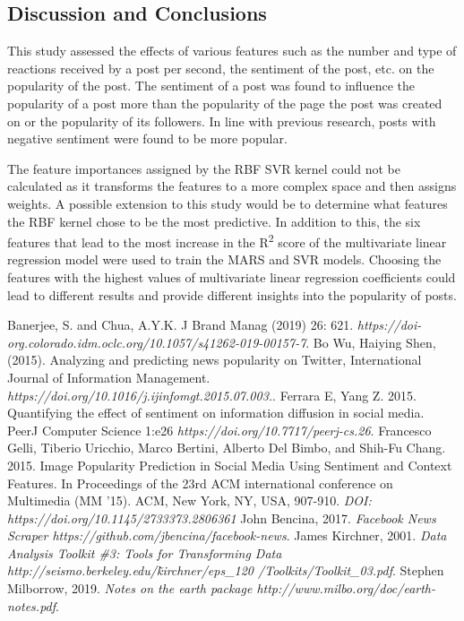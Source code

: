 \documentclass[twoside]{article}
\begin{document}
\begin{multicols}{2}
\section{Discussion and Conclusions}
This study assessed the effects of various features such as the number and type of reactions received by a post per second, the sentiment of the post, etc. on the popularity of the post. The sentiment of a post was found to influence the popularity of a post more than the popularity of the page the post was created on or the popularity of its followers. In line with previous research, posts with negative sentiment were found to be more popular. 

The feature importances assigned by the RBF SVR kernel could not be calculated as it transforms the features to a more complex space and then assigns weights. A possible extension to this study would be to determine what features the RBF kernel chose to be the most predictive. In addition to this, the six features that lead to the most increase in the R\textsuperscript{2} score of the multivariate linear regression model were used to train the MARS and SVR models. Choosing the features with the highest values of multivariate linear regression coefficients could lead to different results and provide different insights into the popularity of posts. 
\begin{thebibliography}{9}
Banerjee, S. and Chua, A.Y.K. J Brand Manag (2019) 26: 621. \textit{https://doi-org.colorado.idm.oclc.org/10.1057/s41262-019-00157-7}.
Bo Wu, Haiying Shen, (2015). Analyzing and predicting news popularity on Twitter,
International Journal of Information Management.
\textit{https://doi.org/10.1016/j.ijinfomgt.2015.07.003.}.
Ferrara E, Yang Z. 2015. Quantifying the effect of sentiment on information diffusion in social media. PeerJ Computer Science 1:e26 
\textit{https://doi.org/10.7717/peerj-cs.26}.
Francesco Gelli, Tiberio Uricchio, Marco Bertini, Alberto Del Bimbo, and Shih-Fu Chang. 2015. Image Popularity Prediction in Social Media Using Sentiment and Context Features. In Proceedings of the 23rd ACM international conference on Multimedia (MM '15). ACM, New York, NY, USA, 907-910. 
\textit{DOI: https://doi.org/10.1145/2733373.2806361}
John Bencina, 2017.
\textit{Facebook News Scraper https://github.com/jbencina/facebook-news}. 
James Kirchner, 2001.
\textit{Data Analysis Toolkit \#3: Tools for Transforming Data http://seismo.berkeley.edu/\~kirchner/eps\_120
/Toolkits/Toolkit\_03.pdf}.
Stephen Milborrow, 2019.
\textit{Notes on the earth package  
http://www.milbo.org/doc/earth-notes.pdf}.
\end{thebibliography}
\end{multicols}
\end{document}
